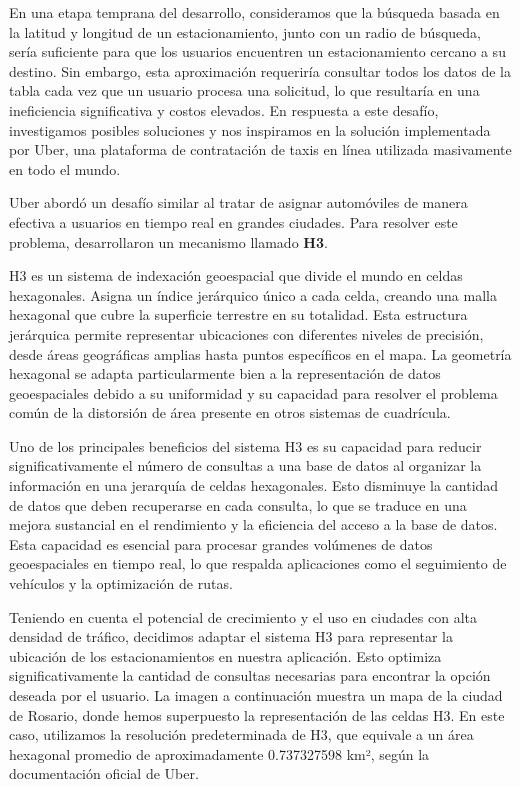 En una etapa temprana del desarrollo, consideramos que la búsqueda basada en la latitud y longitud de un estacionamiento, junto con un radio de búsqueda, sería suficiente para que los usuarios encuentren un estacionamiento cercano a su destino. Sin embargo, esta aproximación requeriría consultar todos los datos de la tabla cada vez que un usuario procesa una solicitud, lo que resultaría en una ineficiencia significativa y costos elevados. En respuesta a este desafío, investigamos posibles soluciones y nos inspiramos en la solución implementada por Uber, una plataforma de contratación de taxis en línea utilizada masivamente en todo el mundo.

Uber abordó un desafío similar al tratar de asignar automóviles de manera efectiva a usuarios en tiempo real en grandes ciudades. Para resolver este problema, desarrollaron un mecanismo llamado \textbf{H3}.

H3 es un sistema de indexación geoespacial que divide el mundo en celdas hexagonales. Asigna un índice jerárquico único a cada celda, creando una malla hexagonal que cubre la superficie terrestre en su totalidad. Esta estructura jerárquica permite representar ubicaciones con diferentes niveles de precisión, desde áreas geográficas amplias hasta puntos específicos en el mapa. La geometría hexagonal se adapta particularmente bien a la representación de datos geoespaciales debido a su uniformidad y su capacidad para resolver el problema común de la distorsión de área presente en otros sistemas de cuadrícula.


Uno de los principales beneficios del sistema H3 es su capacidad para reducir significativamente el número de consultas a una base de datos al organizar la información en una jerarquía de celdas hexagonales. Esto disminuye la cantidad de datos que deben recuperarse en cada consulta, lo que se traduce en una mejora sustancial en el rendimiento y la eficiencia del acceso a la base de datos. Esta capacidad es esencial para procesar grandes volúmenes de datos geoespaciales en tiempo real, lo que respalda aplicaciones como el seguimiento de vehículos y la optimización de rutas.


Teniendo en cuenta el potencial de crecimiento y el uso en ciudades con alta densidad de tráfico, decidimos adaptar el sistema H3 para representar la ubicación de los estacionamientos en nuestra aplicación. Esto optimiza significativamente la cantidad de consultas necesarias para encontrar la opción deseada por el usuario. La imagen a continuación muestra un mapa de la ciudad de Rosario, donde hemos superpuesto la representación de las celdas H3. En este caso, utilizamos la resolución predeterminada de H3, que equivale a un área hexagonal promedio de aproximadamente 0.737327598 km², según la documentación oficial de Uber.

